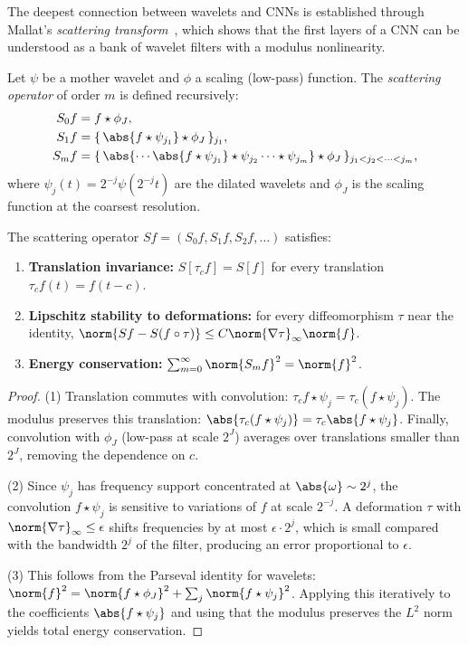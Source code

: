 The deepest connection between wavelets and CNNs is established through Mallat's
\emph{scattering transform}~\citep{Mallat2012scattering}, which shows that the
first layers of a CNN can be understood as a bank of wavelet filters with a
modulus nonlinearity.

\begin{definition}
\label{def:grids:scattering}
Let $\psi$ be a mother wavelet and $\phi$ a scaling (low-pass) function. The
\emph{scattering operator} of order $m$ is defined recursively:
\begin{align}
S_0 f &= f \star \phi_J, \nonumber \\
S_1 f &= \{\,\abs{f \star \psi_{j_1}} \star \phi_J\,\}_{j_1}, \nonumber \\
S_m f &= \{\,\abs{\cdots\abs{f \star \psi_{j_1}} \star \psi_{j_2}\cdots \star \psi_{j_m}} \star \phi_J\,\}_{j_1 < j_2 < \cdots < j_m},
\end{align}
where $\psi_j(t) = 2^{-j}\psi(2^{-j}t)$ are the dilated wavelets and $\phi_J$ is
the scaling function at the coarsest resolution.
\end{definition}

\begin{proposition}
\label{prop:grids:scattering}
The scattering operator $Sf = (S_0 f, S_1 f, S_2 f, \ldots)$ satisfies:
\begin{enumerate}
  \item \textbf{Translation invariance:} $S[\tau_c f] = S[f]$ for every
    translation $\tau_c f(t) = f(t - c)$.
  \item \textbf{Lipschitz stability to deformations:} for every diffeomorphism
    $\tau$ near the identity,
    $\norm{Sf - S(f \circ \tau)} \leq C\norm{\nabla \tau}_\infty \norm{f}$.
  \item \textbf{Energy conservation:} $\sum_{m=0}^{\infty} \norm{S_m f}^2 = \norm{f}^2$.
\end{enumerate}
\end{proposition}

\begin{proof}
(1) Translation commutes with convolution:
$\tau_c f \star \psi_j = \tau_c(f \star \psi_j)$. The modulus preserves this
translation: $\abs{\tau_c(f \star \psi_j)} = \tau_c\abs{f \star \psi_j}$.
Finally, convolution with $\phi_J$ (low-pass at scale $2^J$) averages over
translations smaller than $2^J$, removing the dependence on $c$.

(2) Since $\psi_j$ has frequency support concentrated at $\abs{\omega} \sim 2^j$,
the convolution $f \star \psi_j$ is sensitive to variations of $f$ at scale
$2^{-j}$. A deformation $\tau$ with $\norm{\nabla \tau}_\infty \leq \epsilon$
shifts frequencies by at most $\epsilon \cdot 2^j$, which is small compared with
the bandwidth $2^j$ of the filter, producing an error proportional to $\epsilon$.

(3) This follows from the Parseval identity for wavelets:
$\norm{f}^2 = \norm{f \star \phi_J}^2 + \sum_j \norm{f \star \psi_j}^2$. Applying
this iteratively to the coefficients $\abs{f \star \psi_j}$ and using that the
modulus preserves the $L^2$ norm yields total energy conservation.
\end{proof}


